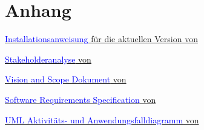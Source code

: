 \chapter{Anhang}
\label{ch:Anhang}

\href{https://github.com/HWR-Berlin-SWE-I-Gruppe-2-Team-3-2021/Genderly}{\textcolor{blue}{Installationsanweisung} für die aktuellen Version von \Genderly}

\href{https://github.com/HWR-Berlin-SWE-I-Gruppe-2-Team-3-2021/Dokumentation/releases/download/1.3.0/SHA_IT20_KursB_Team3.zip}{\textcolor{blue}{Stakeholderanalyse} von \Genderly}

\href{https://github.com/HWR-Berlin-SWE-I-Gruppe-2-Team-3-2021/Dokumentation/releases/download/1.3.0/VSD_IT20_KursB_Team3.zip}{\textcolor{blue}{Vision and Scope Dokument} von \Genderly}

\href{https://github.com/HWR-Berlin-SWE-I-Gruppe-2-Team-3-2021/Dokumentation/releases/download/1.3.0/SRS_IT20_KursB_Team3.zip}{\textcolor{blue}{Software Requirements Specification} von \Genderly}

\href{https://github.com/HWR-Berlin-SWE-I-Gruppe-2-Team-3-2021/Dokumentation/releases/download/1.3.0/UML_IT20_KursB_Team3.zip}{\textcolor{blue}{UML Aktivitäts- und Anwendungsfalldiagramm} von \Genderly}